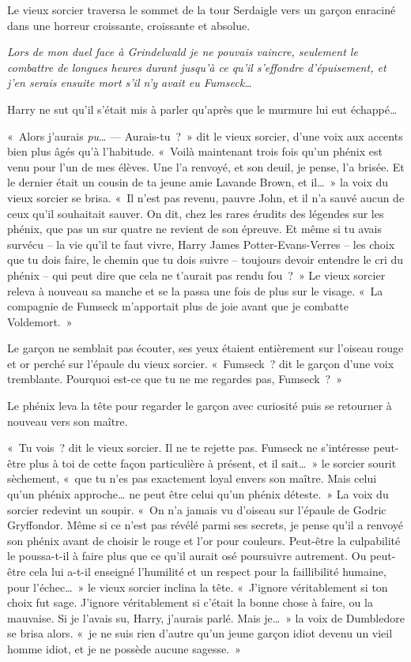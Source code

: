 Le vieux sorcier traversa le sommet de la tour Serdaigle vers un garçon enraciné dans une horreur croissante, croissante et absolue.

\emph{Lors de mon duel face à Grindelwald je ne pouvais vaincre, seulement le combattre de longues heures durant jusqu'à ce qu'il s'effondre d'épuisement, et j'en serais ensuite mort s'il n'y avait eu Fumseck…}

Harry ne sut qu'il s'était mis à parler qu'après que le murmure lui eut échappé…

«~Alors j'aurais \emph{pu}…
---  Aurais-tu~?~» dit le vieux sorcier, d'une voix aux accents bien plus âgés qu'à l'habitude. «~Voilà maintenant trois fois qu'un phénix est venu pour l'un de mes élèves. Une l'a renvoyé, et son deuil, je pense, l'a brisée. Et le dernier était un cousin de ta jeune amie Lavande Brown, et il…~» la voix du vieux sorcier se brisa. «~Il n'est pas revenu, pauvre John, et il n'a sauvé aucun de ceux qu'il souhaitait sauver. On dit, chez les rares érudits des légendes sur les phénix, que pas un sur quatre ne revient de son épreuve. Et même si tu avais survécu -- la vie qu'il te faut vivre, Harry James Potter-Evans-Verres -- les choix que tu dois faire, le chemin que tu dois suivre -- toujours devoir entendre le cri du phénix -- qui peut dire que cela ne t'aurait pas rendu fou~?~» Le vieux sorcier releva à nouveau sa manche et se la passa une fois de plus sur le visage. «~La compagnie de Fumseck m'apportait plus de joie avant que je combatte Voldemort.~»

Le garçon ne semblait pas écouter, ses yeux étaient entièrement sur l'oiseau rouge et or perché sur l'épaule du vieux sorcier. «~Fumseck~? dit le garçon d'une voix tremblante. Pourquoi est-ce que tu ne me regardes pas, Fumseck~?~»

Le phénix leva la tête pour regarder le garçon avec curiosité puis se retourner à nouveau vers son maître.

«~Tu vois~? dit le vieux sorcier. Il ne te rejette pas. Fumseck ne s'intéresse peut-être plus à toi de cette façon particulière à présent, et il sait…~» le sorcier sourit sèchement, «~que tu n'es pas exactement loyal envers son maître. Mais celui qu'un phénix approche… ne peut être celui qu'un phénix déteste.~» La voix du sorcier redevint un soupir. «~On n'a jamais vu d'oiseau sur l'épaule de Godric Gryffondor. Même si ce n'est pas révélé parmi ses secrets, je pense qu'il a renvoyé son phénix avant de choisir le rouge et l'or pour couleurs. Peut-être la culpabilité le poussa-t-il à faire plus que ce qu'il aurait osé poursuivre autrement. Ou peut-être cela lui a-t-il enseigné l'humilité et un respect pour la faillibilité humaine, pour l'échec…~» le vieux sorcier inclina la tête. «~J'ignore véritablement si ton choix fut sage. J'ignore véritablement si c'était la bonne chose à faire, ou la mauvaise. Si je l'avais su, Harry, j'aurais parlé. Mais je…~» la voix de Dumbledore se brisa alors. «~je ne suis rien d'autre qu'un jeune garçon idiot devenu un vieil homme idiot, et je ne possède aucune sagesse.~»

